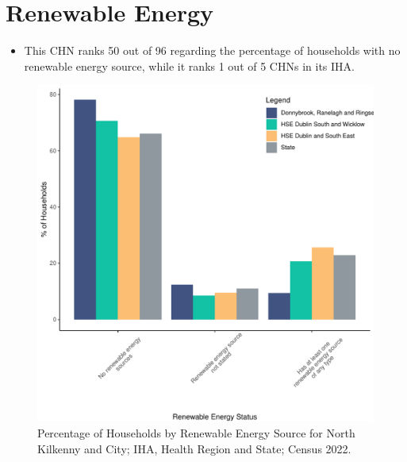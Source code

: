 \documentclass{article}
\begin{document}
\section{Renewable Energy}\label{sect:RE}
\begin{itemize}
\item This CHN ranks  50 out of 96 regarding the percentage of households with no renewable energy source, while it ranks   1 out of 5 CHNs in its IHA.
\end{itemize}
\begin{figure}[H]
	\centering
	\includegraphics[width = 140mm]{../figures/RenewableEnergyED.pdf}
	\caption{Percentage of Households by Renewable Energy Source for North Kilkenny and City; IHA, Health Region and State; Census 2022.}
	\label{fig:vbnv}
	\end{figure}
\end{document}
